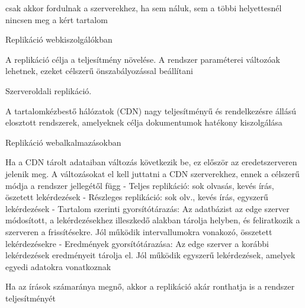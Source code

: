 \documentclass[twoside, a4paper, 12pt]{article}
\begin{document}
\begin{description}
                                                                        csak akkor fordulnak a szerverekhez, ha sem náluk, sem a többi helyettesnél nincsen meg a kért tartalom
                                                                    \item  Replikáció webkiszolgálókban
                                                                    \item A replikáció célja a teljesítmény növelése. A rendszer paraméterei változóak lehetnek, ezeket célszerű önszabályozással beállítani
                                                                    \item  Szerveroldali replikáció.
                                                                    \item A tartalomkézbestő hálózatok (CDN) nagy teljesítményű és rendelkezésre állású elosztott rendszerek, amelyeknek célja
                                                                        dokumentumok hatékony kiszolgálása
                                                                    \item  Replikáció webalkalmazásokban
                                                                    \item Ha a CDN tárolt adataiban változás következik be, ez először az eredetszerveren jelenik meg. A változásokat el kell juttatni
                                                                        a CDN szerverekhez, ennek a célszerű módja a rendszer jellegétől függ
                                                                        - Teljes replikáció: sok olvasás, kevés írás, öszetett lekérdezések
                                                                        - Részleges replikáció: sok olv., kevés írás, egyszerű lekérdezések
                                                                        - Tartalom szerinti gyorsítótárazás: Az adatbázist az edge szerver módosított, a lekérdezésekhez illeszkedő alakban
                                                                        tárolja helyben, és feliratkozik a szerveren a frissítésekre. Jól működik intervallumokra vonakozó, összetett lekérdezésekre
                                                                        - Eredmények gyorsítótárazása: Az edge szerver a korábbi lekérdezések eredményeit tárolja el. Jól működik egyszerű
                                                                        lekérdezések, amelyek egyedi adatokra vonatkoznak
                                                                    \item Ha az írások számaránya megnő, akkor a replikáció akár ronthatja is a rendszer teljesítményét 

\end{description}
\end{document}
